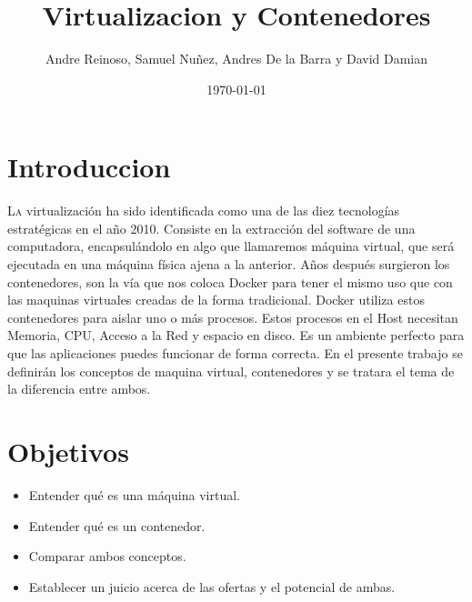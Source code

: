 \documentclass[twoside,twocolumn]{article}
\title{Virtualizacion y Contenedores} %
\author{Andre Reinoso, Samuel Nuñez, Andres De la Barra y David Damian}
\date{\today} %
\begin{document}
\maketitle


\section{Introduccion}

\lettrine[nindent=0em,lines=3]{L}a virtualización ha sido identificada como una de las diez tecnologías estratégicas en el año 2010. Consiste en la extracción del software de una computadora, encapsulándolo en algo que llamaremos máquina virtual, que será ejecutada en una máquina física ajena a la anterior.
Años después surgieron los contenedores, son la vía que nos coloca Docker para tener el mismo uso que con las maquinas virtuales creadas de la forma tradicional. Docker utiliza estos contenedores para aislar uno o más procesos. Estos procesos en el Host necesitan Memoria, CPU, Acceso a la Red y espacio en disco. Es un ambiente perfecto para que las aplicaciones puedes funcionar de forma correcta.
En el presente trabajo se definirán los conceptos de maquina virtual, contenedores y se tratara el tema de la diferencia entre ambos.




\section{Objetivos}

\begin{itemize}
\item Entender qué es una máquina virtual.
\item Entender qué es un contenedor.
\item Comparar ambos conceptos.
\item Establecer un juicio acerca de las ofertas y el potencial de ambas.

\end{itemize}




\end{document}
